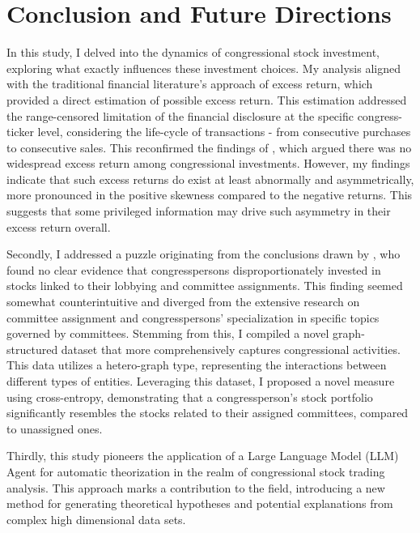 \documentclass[15pt,letterpaper]{article}
\begin{document}

\section{Conclusion and Future Directions}
In this study, I delved into the dynamics of congressional stock investment, exploring what exactly influences these investment choices. My analysis aligned with the traditional financial literature's approach of excess return, which provided a direct estimation of possible excess return. This estimation addressed the range-censored limitation of the financial disclosure at the specific congress-ticker level, considering the life-cycle of transactions - from consecutive purchases to consecutive sales. This reconfirmed the findings of \cite{eg13}, which argued there was no widespread excess return among congressional investments. However, my findings indicate that such excess returns do exist at least abnormally and asymmetrically, more pronounced in the positive skewness compared to the negative returns. This suggests that some privileged information may drive such asymmetry in their excess return overall.

Secondly, I addressed a puzzle originating from the conclusions drawn by \cite{eg14}, who found no clear evidence that congresspersons disproportionately invested in stocks linked to their lobbying and committee assignments. This finding seemed somewhat counterintuitive and diverged from the extensive research on committee assignment and congresspersons' specialization in specific topics governed by committees. Stemming from this, I compiled a novel graph-structured dataset that more comprehensively captures congressional activities. This data utilizes a hetero-graph type, representing the interactions between different types of entities. Leveraging this dataset, I proposed a novel measure using cross-entropy, demonstrating that a congressperson's stock portfolio significantly resembles the stocks related to their assigned committees, compared to unassigned ones.

Thirdly, this study pioneers the application of a Large Language Model (LLM) Agent for automatic theorization in the realm of congressional stock trading analysis. This approach marks a contribution to the field, introducing a new method for generating theoretical hypotheses and potential explanations from complex high dimensional data sets.
\end{document}
